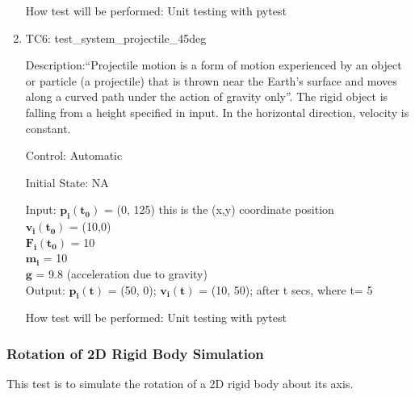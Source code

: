 \documentclass[12pt, titlepage]{article}
\begin{document}
\begin{enumerate}
How test will be performed: Unit testing with pytest

\item{TC6: test\_system\_projectile\_45deg\\}

Description:``Projectile motion is a form of motion experienced by an object or particle (a projectile) that is thrown near the Earth's surface and moves along a curved path under the action of gravity only''. The rigid object is falling from a height specified in input. In the horizontal direction, velocity is constant.

Control: Automatic

Initial State: NA

Input: $\mathbf{p_i}$$\mathbf{(t_0)}$ = (0, 125) this is the (x,y) coordinate position\\
\hspace*{1.3cm}$\mathbf{v_i}$$\mathbf{(t_0)}$ = (10,0)\\
\hspace*{1.3cm}$\mathbf{F_i}$$\mathbf{(t_0)}$ = 10\\
\hspace*{1.3cm}$\mathbf{m_i}$$ \mathbf{}$ = 10\\
\hspace*{1.3cm}$\mathbf{g}$$\mathbf{}$ = 9.8 (acceleration due to gravity)\\
Output: $\mathbf{p_i}$$\mathbf{(t)}$ = (50, 0);
$\mathbf{v_i}$$\mathbf{(t)}$ = (10, 50); after t secs, where t= 5 

How test will be performed: Unit testing with pytest\\

\end{enumerate}



\subsubsection{Rotation of 2D Rigid Body Simulation}
This test is to simulate the rotation of a 2D rigid body about its axis.
\end{document}

